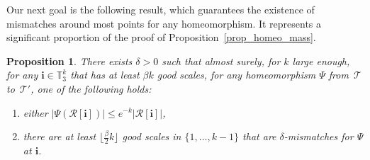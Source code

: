 \documentclass[11pt]{article}
\newcommand{\Tt}{\mathcal{T}}
\newcommand{\Rr}{\mathcal{R}}
\newcommand{\ii}{\mathbf{i}}
\theoremstyle{plain}
\newtheorem{proposition}[theorem]{Proposition}
\theoremstyle{definition}
\numberwithin{equation}{section}
\begin{document}
Our next goal is the following result, which guarantees the existence of mismatches around most points for any homeomorphism.
It represents a significant proportion of the proof of Proposition~\ref{prop_homeo_mass}.
\begin{proposition}\label{prop_existence_mismatches}
There exists $\delta>0$ such that almost surely, for $k$ large enough, for any $\ii \in \mathbb{T}_3^k$ that has at least $\beta k$ good scales, for any homeomorphism $\Psi$ from~$\Tt$ to~$\Tt'$, one of the following holds:
\begin{enumerate}
\item \label{it:prop:image region is small} either $\left| \Psi \left( \Rr[\ii] \right) \right| \leq e^{-k} \left| \Rr[\ii] \right|$,
\item\label{it:prop:many mismatches} there are at least $\lfloor\frac{\beta}{2} k \rfloor$ good scales in $\{1,\dots,k-1\}$ that are $\delta$-mismatches for $\Psi$ at $\ii$.
\end{enumerate}
\end{proposition}
\end{document}
